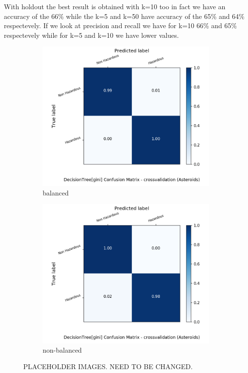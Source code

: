 \documentclass{article}
\begin{document}
With holdout the best result is  obtained with  k=10 too in fact we have an accuracy of the 66\% while the k=5 and k=50 have accuracy of the 65\% and 64\% respectevely.
If we look at precision and recall we have for k=10 66\% and 65\% respectevely while for k=5 and k=10 we have lower values.


\begin{figure}[H]
	\centering
	\begin{subfigure}{.5\textwidth}
		\centering
		\includegraphics[width=1.1\textwidth]{Plots/asteroids/asteroids_DecisionTree_gini_balance_True_crossvalidation.png}
		\caption{balanced}
	\end{subfigure}%
	\begin{subfigure}{.5\textwidth}
		\centering
		\includegraphics[width=1.1\textwidth]{Plots/asteroids/asteroids_DecisionTree_gini_balance_False_crossvalidation.png}
		\caption{non-balanced}
	\end{subfigure}
	\caption{{\color{red} PLACEHOLDER IMAGES. NEED TO BE CHANGED.}}
\end{figure}
\end{document}
